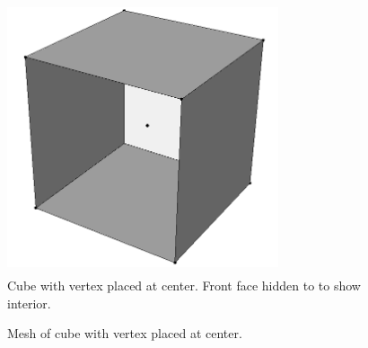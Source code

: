 \documentclass[a4paper, 12pt]{article}
\begin{document}
\begin{figure}[H]
  \centering
  \includegraphics[width=8cm, height=8cm]{test3_smd}
  \caption{Cube with vertex placed at center. Front face hidden to 
        to show interior.}
  \label{fig:vert1model}
\end{figure}

\begin{figure}[H]
  \centering
  \caption{Mesh of cube with vertex placed at center.}
  \label{fig:vert1mesh}
\end{figure}
\end{document}
